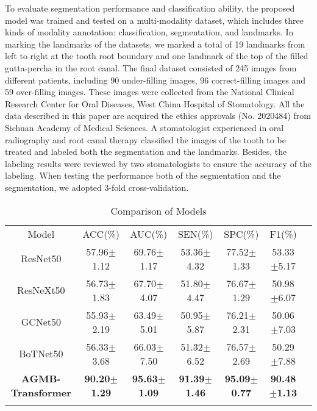 \documentclass[journal]{IEEEtran}
\begin{document}
To evaluate segmentation performance and classification ability, the proposed model was trained and tested on a multi-modality dataset, which includes three kinds of modality annotation: classification, segmentation, and landmarks. In marking the landmarks of the datasets, we marked a total of 19 landmarks from left to right at the tooth root boundary and one landmark of the top of the filled gutta-percha in the root canal. The final dataset consisted of 245 images from different patients, including 90 under-filling images, 96 correct-filling images and 59 over-filling images. These images were collected from the National Clinical Research Center for Oral Diseases, West China Hospital of Stomatology. All the data described in this paper are acquired the ethics approvals (No. 2020484) from Sichuan Academy of Medical Sciences. A stomatologist experienced in oral radiography and root canal therapy classified the images of the tooth to be treated and labeled both the segmentation and the landmarks. Besides, the labeling results were reviewed by two stomatologists to ensure the accuracy of the labeling. When testing the performance both of the segmentation and the segmentation, we adopted 3-fold cross-validation. 


\begin{table*}[ht]
\centering
\renewcommand\arraystretch{1.2}
\setlength{\tabcolsep}{5.6mm}
\caption{Comparison of Models}
\begin{tabular}{c|cccccc}
\Xhline{1pt}
Model    & ACC(\%)&AUC(\%) & SEN(\%) & SPC(\%) & F1(\%)   \\ \cline{1-6}

ResNet50  & 57.96$\pm$1.12  & 69.76$\pm$1.17 & 53.36$\pm$4.32  & 77.52$\pm$1.33  & 53.33$\pm$5.17 \\ \cline{1-6}
ResNeXt50  & 56.73$\pm$1.83  & 67.70$\pm$4.07 & 51.80$\pm$4.47  & 76.67$\pm$1.29  & 50.98$\pm$6.07 \\ \cline{1-6}
GCNet50 & 55.93$\pm$2.19  & 63.49$\pm$5.01 & 50.95$\pm$5.87  & 76.21$\pm$2.31  & 50.06$\pm$7.03 \\ \cline{1-6}
BoTNet50  & 56.33$\pm$3.68  & 66.03$\pm$7.50 & 51.32$\pm$6.52  & 76.57$\pm$2.69  & 50.29$\pm$7.88 \\ \cline{1-6}

\textbf{AGMB-Transformer}   & \textbf{90.20$\pm$1.29} & \textbf{95.63$\pm$1.09}    & \textbf{91.39$\pm$1.46}    & \textbf{95.09$\pm$0.77} & \textbf{90.48$\pm$1.13} \\ \Xhline{1pt}
\end{tabular}
\label{tab1}
\end{table*}
\end{document}

